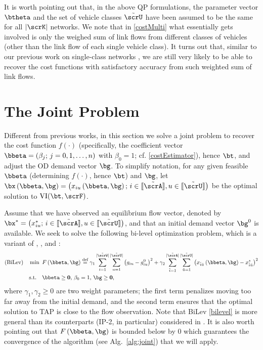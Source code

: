 \documentclass[3p]{elsarticle}
\newcommand*{\defeq}{\stackrel{\text{def}}{=}}
\begin{document}
It is worth pointing out that, in the above QP formulations, the
parameter vector ${\btheta}$ and the set of vehicle classes
$\tilde{\scrU}$ have been assumed to be the same for all $|\scrK|$
networks. We note that in \eqref{costMulti} what essentially gets
involved is only the weighed sum of link flows from different classes of
vehicles (other than the link flow of each single vehicle class). It
turns out that, similar to our previous work on single-class networks
\cite{CDC16,IFAC17}, we are still very likely to be able to recover the
cost functions with satisfactory accuracy from such weighted sum of link
flows.

\section{The Joint Problem} \label{sec:joint}
	
Different from previous works, in this section we solve a joint problem
to recover the cost function $f(\cdot)$ (specifically, the coefficient
vector $\bbeta = \left( {{\beta _j};\,j = 0, 1, \ldots ,n} \right)$ with
$\beta_0 = 1$; cf. \eqref{costEstimator}), hence $\bt$, and adjust the
OD demand vector $\bg$.  To simplify notation, for any given feasible
$\bbeta$ (determining $f(\cdot)$, hence $\bt$) and $\bg$, let
$\bx\left(\bbeta, \bg \right) = \big( {x_{iu}}\left(\bbeta, \bg \right);
\, i \in [\kern-0.15em[ \tilde \scrA ]\kern-0.15em],u \in [\kern-0.15em[
\tilde \scrU ]\kern-0.15em]\big)$ be the optimal solution to
$\text{VI}(\bt,\scrF)$.
	
Assume that we have observed an equilibrium flow vector, denoted by
$\bx^* = \big( {x^*_{iu}; \,i \in [\kern-0.15em[ \tilde\scrA
  ]\kern-0.15em], u \in [\kern-0.15em[ \tilde\scrU ]\kern-0.15em]}
\big)$, and that an initial demand vector ${\bg^0}$ is available. We
seek to solve the following bi-level optimization problem, which is a
variant of \cite[(1)-(2)]{spiess1990gradient},
\cite[(1)-(8)]{noriega2007multi}, and \cite[(9)]{IFAC17}:
\begin{align}
	\text{(BiLev)} \quad \mathop {\min }\limits {\text{  }}&F\left(\bbeta, \bg \right) \defeq
	{\gamma _1}\sum\limits_{i = 1} ^{ |\tilde \scrW| }\sum\limits_{u = 1}^{|\tilde \scrU|} {{{\left( {{g_{iu}} - g^0_{iu}} \right)}^2}} + \gamma_2\sum\limits_{\check{i} = 1}^{|\tilde \scrA|} {\sum\limits_{\check{u} = 1}^{|\tilde \scrU|}{{{\left( {{x_{\check{i}\check{u}}}\left(\bbeta, \bg \right) - {{x}^*_{\check{i}\check{u}}}} \right)}^2}}} \label{bilevel}  \\
	\text{s.t.}\quad & {\bbeta \geq \textbf{0},\,\beta_0 = 1, \,\bg \geq \textbf{0}},  \notag
\end{align}
where $\gamma_1, \gamma_2 \geq 0$ are two weight parameters; the first
term penalizes moving too far away from the initial demand, and the
second term ensures that the optimal solution to TAP is close to the
flow observation. Note that BiLev \eqref{bilevel} is more general than
its counterparts (IP-2, in particular) considered in
\cite{spiess1990gradient,noriega2007multi,IFAC17}.  It is also worth
pointing out that $F\left(\bbeta, \bg \right)$ is bounded below by $0$
which guarantees the convergence of the algorithm (see
Alg.~\ref{alg:joint}) that we will apply.
		
\end{document}
